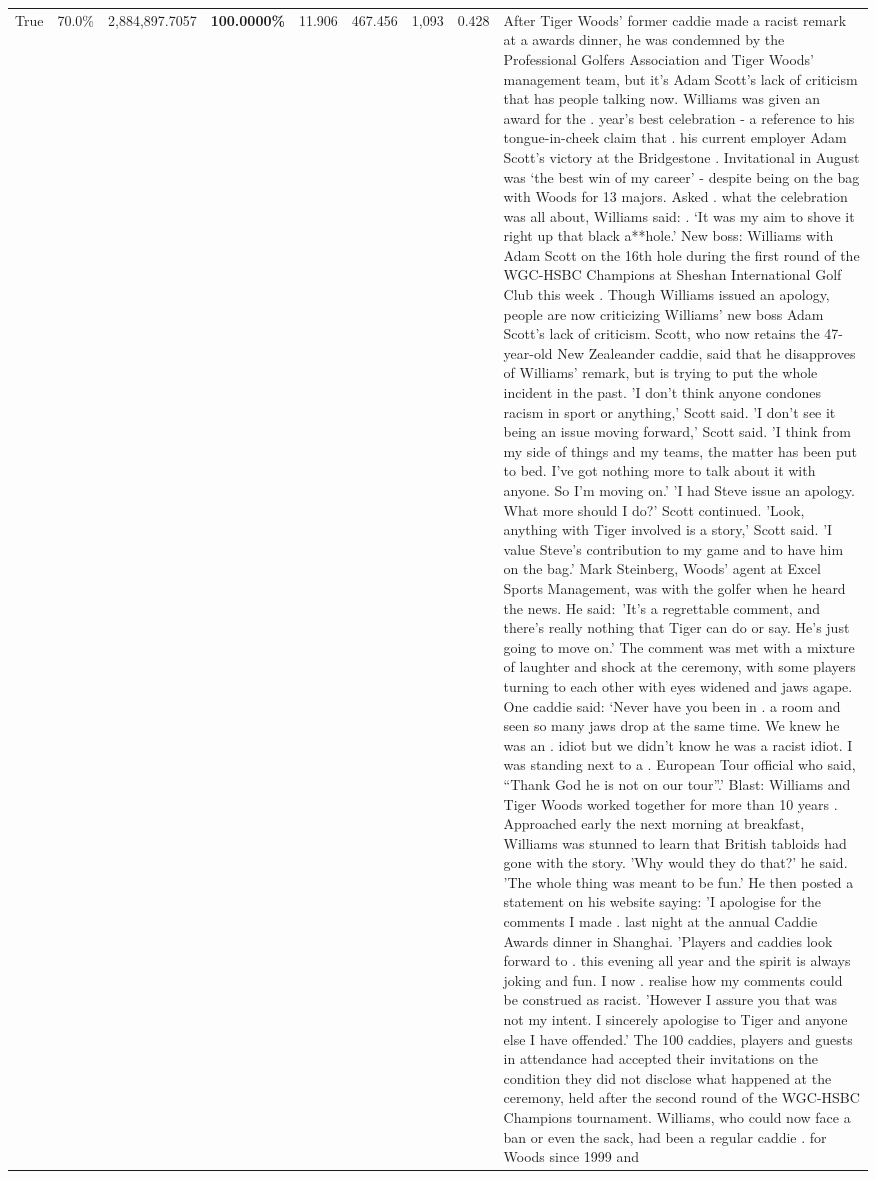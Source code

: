 \begin{table}[H]
\begin{tabular}{lllrlllll}
True & 70.0\% & 2,884,897.7057 & \bfseries \color{red} 100.0000\% & 11.906 & 467.456 & 1,093 & 0.428 & After Tiger Woods' former caddie made a racist remark at a awards dinner, he was condemned by the Professional Golfers Association and Tiger Woods' management team, but it's Adam Scott's lack of criticism that has people talking now. Williams was given an award for the . year’s best celebration - a reference to his tongue-in-cheek claim that . his current employer Adam Scott’s victory at the Bridgestone . Invitational in August was ‘the best win of my career’ - despite being on the bag with Woods for 13 majors. Asked . what the celebration was all about, Williams said: . ‘It was my aim to shove it right up that black a**hole.’ New boss: Williams with Adam Scott  on the 16th hole during the first round of the WGC-HSBC Champions at Sheshan International Golf Club this week . Though Williams issued an apology, people are now criticizing Williams' new boss Adam Scott's lack of criticism. Scott, who now retains the 47-year-old New Zealeander caddie, said that he disapproves of Williams' remark, but is trying to put the whole incident in the past. 'I don't think anyone condones racism in sport or anything,' Scott said. 'I don't see it being an issue moving forward,' Scott said. 'I think from my side of things and my teams, the matter has been put to bed. I've got nothing more to talk about it with anyone. So I'm moving on.' 'I had Steve issue an apology. What more should I do?' Scott continued. 'Look, anything with Tiger involved is a story,' Scott said. 'I value Steve's contribution to my game and to have him on the bag.' Mark Steinberg, Woods' agent at Excel Sports Management, was with the golfer when he heard the news. He said: 'It's a regrettable comment, and there's really nothing that Tiger can do or say. He's just going to move on.' The comment was met with a mixture of laughter and shock at the ceremony, with some players turning to each other with eyes widened and jaws agape. One caddie said: ‘Never have you been in . a room and seen so many jaws drop at the same time. We knew he was an . idiot but we didn’t know he was a racist idiot. I was standing next to a . European Tour official who said, “Thank God he is not on our tour”.’ Blast: Williams and Tiger Woods worked together for more than 10 years . Approached early the next morning at breakfast, Williams was stunned to learn that British tabloids had gone with the story. 'Why would they do that?' he said. 'The whole thing was meant to be fun.' He then posted a statement on his website saying: 'I apologise for the comments I made . last night at the annual Caddie Awards dinner in Shanghai. 'Players and caddies look forward to . this evening all year and the spirit is always joking and fun. I now . realise how my comments could be construed as racist. 'However I assure you that was not my intent. I sincerely apologise to Tiger and anyone else I have offended.' The 100 caddies, players and guests in attendance had accepted their invitations on the condition they did not disclose what happened at the ceremony, held after the second round of the WGC-HSBC Champions tournament. Williams, who could now face a ban or even the sack, had been a regular caddie . for Woods since 1999 and 
\end{tabular}
\end{table}
